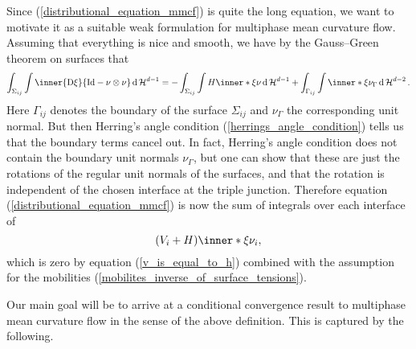 Since (\ref{distributional_equation_mmcf}) is quite the long equation, we want 
to motivate it as a suitable weak formulation for multiphase mean curvature 
flow. 
Assuming that everything is nice and smooth, we have by the 
Gauss--Green theorem on surfaces 
\cite[Thm.~11.8]{maggi_sets_of_finite_perimeter} that
\begin{equation*}
	\int_{ \Sigma_{ i j } }
	\int 
	\inner{ \diff \xi }{ \mathrm{Id} - \nu \otimes \nu }
	\dd{\hm^{ d- 1 }}
	=
	-
	\int_{ \Sigma_{ i j } }
	\int
	H \inner*{ \xi }{ \nu }
	\dd{\hm^{ d- 1 }}
	+
	\int_{ \Gamma_{ i j } }
	\int
	\inner*{ \xi }{ \nu_{ \Gamma } }
	\dd{ \hm^{ d - 2 } }.
\end{equation*}
Here $ \Gamma_{ i j } $ denotes the boundary of the surface $ \Sigma_{ i j 
} $ and $ \nu_{ \Gamma } $ the corresponding unit normal. But then Herring's 
angle condition 
(\ref{herrings_angle_condition}) tells us that the boundary terms cancel 
out. In fact, Herring's angle condition does not contain the boundary unit 
normals $ \nu_{ \Gamma } $, but one can show that these are just the rotations 
of the regular unit normals of the surfaces, and that the rotation is 
independent of the chosen interface at the triple junction. Therefore equation 
(\ref{distributional_equation_mmcf}) is now the sum of integrals over
each interface of
\begin{equation*}
	(V_{ i } + H) \inner*{ \xi }{ \nu_{ i } },
\end{equation*}
which is zero by equation (\ref{v_is_equal_to_h}) combined with the 
assumption for the mobilities (\ref{mobilites_inverse_of_surface_tensions}).

Our main goal will be to arrive at a conditional convergence result 
to multiphase mean curvature flow in the sense of the above definition. 
This is captured by the following.

